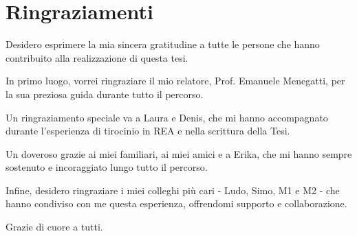 \chapter*{Ringraziamenti}

Desidero esprimere la mia sincera gratitudine a tutte le persone che hanno contribuito alla realizzazione di questa tesi.

In primo luogo, vorrei ringraziare il mio relatore, Prof. Emanuele Menegatti, per la sua preziosa guida durante tutto il percorso. 

Un ringraziamento speciale va a Laura e Denis, che mi hanno accompagnato durante l'esperienza di tirocinio in REA e nella scrittura della Tesi.

Un doveroso grazie ai miei familiari, ai miei amici e a Erika, che mi hanno sempre sostenuto e incoraggiato lungo tutto il percorso.

Infine, desidero ringraziare i miei colleghi più cari - Ludo, Simo, M1 e M2 - che hanno condiviso con me questa esperienza, offrendomi supporto e collaborazione.

Grazie di cuore a tutti.